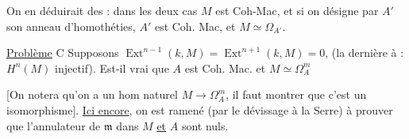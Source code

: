 On en déduirait des  : dans les deux cas $M$ est Coh-Mac, et si on désigne par $A'$ son anneau d'homothéties, $A'$ est Coh. Mac, et $M\simeq\Omega_{A'}$.

\uline{Problème} C Supposons  $\operatorname{Ext}^{n-1}(k,M)=\operatorname{Ext}^{n+1}(k,M)=0$, (la dernière   à : $H^n(M)$ injectif).  Est-il vrai que $A$ est Coh. Mac. et $M\simeq\Omega_A^{m}$

[On notera qu'on a un hom naturel $M\to\Omega_A^{m}$, il faut montrer que c'est un isomorphisme]. \uline{Ici encore}, on est ramené (par le dévissage à la Serre) à prouver que l'annulateur de $\mathfrak m$ dans $M$ \uline{et} $A$  sont nuls.

